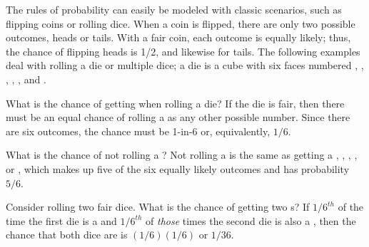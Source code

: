 The rules of probability can easily be modeled with classic scenarios, such as flipping coins or rolling dice. When a coin is flipped, there are only two possible outcomes, heads or tails. With a fair coin, each outcome is equally likely; thus, the chance of flipping heads is 1/2, and likewise for tails. The following examples deal with rolling a die or multiple dice; a die is a cube with six faces numbered , , , , , and . 

\begin{example}{What is the chance of getting  when rolling a die?}\label{probOf1}
If the die is fair, then there must be an equal chance of rolling a  as any other possible number. Since there are six outcomes, the chance must be 1-in-6 or, equivalently, $1/6$.
\end{example}

\begin{example}{What is the chance of not rolling a ?}\label{probNot2}
Not rolling a  is the same as getting a , , , , or , which makes up five of the six equally likely outcomes and has probability $5/6$.
\end{example}

\begin{example} {Consider rolling two fair dice. What is the chance of getting two s?}\label{probOf2Ones}
If $1/6^{th}$ of the time the first die is a  and $1/6^{th}$ of \emph{those} times the second die is also a , then the chance that both dice are  is $(1/6) (1/6)$ or $1/36$.
\end{example}

